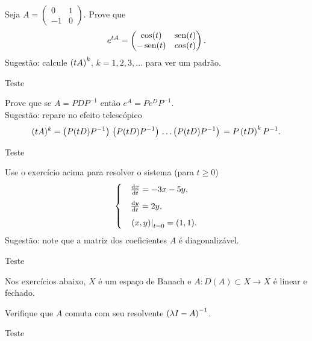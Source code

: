 




\begin{Mybox}
Seja $A = \begin{pmatrix}
0 & 1 \\
-1 & 0 
\end{pmatrix}$. Prove que
\[
e^{t A} = \begin{pmatrix}
\cos(t) & \operatorname{sen}(t) \\
-\operatorname{sen}(t) & cos(t)
\end{pmatrix}.
\]
Sugestão: calcule $\left( tA \right)^k$, $k = 1, 2, 3, \ldots$ para ver um padrão. 
\end{Mybox}
\vspace{-.5cm}
\begin{dem}
Teste
\end{dem}


\begin{Mybox}
Prove que se $A = P D P^{-1}$ então $e^A = P e^D P^{-1}$. \\
Sugestão: repare no efeito telescópico
\[
(tA)^k = \left(  P (tD) P^{-1} \right) \, \left(  P (tD) P^{-1} \right) \, \ldots \left(  P (tD) P^{-1} \right) \, = P \left( tD \right)^k P^{-1}.
\] 
\end{Mybox}
\vspace{-.5cm}
\begin{dem}
Teste
\end{dem}

\begin{Mybox}
Use o exercício acima para resolver o sistema (para $t \geq 0$)
\[
\begin{cases}
&\frac{\dd x}{\dd t} = -3x - 5y, \vspace{0.2cm}\\
&\frac{\dd y}{\dd t} =2y, \vspace{0.2cm}\\
&\left.\parent{x, y}\right|_{t=0} = (1, 1).
\end{cases}
\]
Sugestão: note que a matriz dos coeficientes $A$ é diagonalizável.
\end{Mybox}
\vspace{-.5cm}
\begin{dem}
Teste
\end{dem}
Nos exercícios abaixo, $X$ é um espaço de Banach e $A: D(A) \subset X \to X$ é linear e fechado.
\begin{Mybox}
Verifique que $A$ comuta com seu resolvente $\left( \lambda I - A \right)^{-1}$.
\end{Mybox}
\vspace{-.5cm}
\begin{dem}
Teste
\end{dem}

